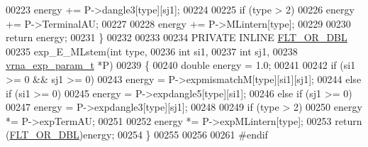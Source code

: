 \begin{DoxyCode}
00223     energy += P->dangle3[type][sj1];
00224 
00225   \textcolor{keywordflow}{if} (type > 2)
00226     energy += P->TerminalAU;
00227 
00228   energy += P->MLintern[type];
00229 
00230   \textcolor{keywordflow}{return} energy;
00231 \}
00232 
00233 
00234 PRIVATE INLINE \hyperlink{group__data__structures_ga31125aeace516926bf7f251f759b6126}{FLT\_OR\_DBL}
00235 exp\_E\_MLstem(\textcolor{keywordtype}{int}              type,
00236              \textcolor{keywordtype}{int}              si1,
00237              \textcolor{keywordtype}{int}              sj1,
00238              \hyperlink{group__energy__parameters_structvrna__exp__param__s}{vrna\_exp\_param\_t} *P)
00239 \{
00240   \textcolor{keywordtype}{double} energy = 1.0;
00241 
00242   \textcolor{keywordflow}{if} (si1 >= 0 && sj1 >= 0)
00243     energy = P->expmismatchM[type][si1][sj1];
00244   \textcolor{keywordflow}{else} \textcolor{keywordflow}{if} (si1 >= 0)
00245     energy = P->expdangle5[type][si1];
00246   \textcolor{keywordflow}{else} \textcolor{keywordflow}{if} (sj1 >= 0)
00247     energy = P->expdangle3[type][sj1];
00248 
00249   \textcolor{keywordflow}{if} (type > 2)
00250     energy *= P->expTermAU;
00251 
00252   energy *= P->expMLintern[type];
00253   \textcolor{keywordflow}{return} (\hyperlink{group__data__structures_ga31125aeace516926bf7f251f759b6126}{FLT\_OR\_DBL})energy;
00254 \}
00255 
00256 
00261 \textcolor{preprocessor}{#endif}
\end{DoxyCode}
